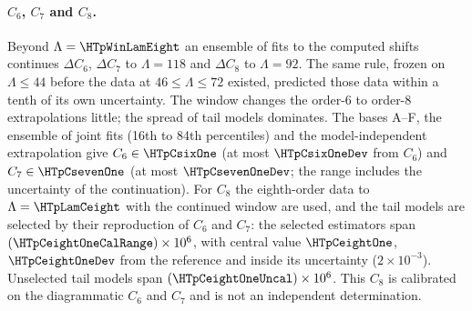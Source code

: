 \paragraph{$C_6$, $C_7$ and $C_8$.} Beyond $\Lambda=\HTpWinLamEight$ an ensemble of fits to the computed shifts continues
$\Delta C_6$, $\Delta C_7$ to $\Lambda=118$ and $\Delta C_8$ to $\Lambda=92$. The same rule, frozen on $\Lambda\le44$ before the data at $46\le\Lambda\le72$ existed, predicted those data within a tenth
of its own uncertainty. The window changes the order-6 to order-8 extrapolations little; the spread of tail models
dominates. The bases A--F, the ensemble of joint fits (16th to 84th percentiles) and the model-independent
extrapolation give $C_6\in\HTpCsixOne$
(at most $\HTpCsixOneDev$ from $C_6$) and $C_7\in\HTpCsevenOne$ (at most $\HTpCsevenOneDev$; the range includes the
uncertainty of the continuation). For $C_8$ the eighth-order data to $\Lambda=\HTpLamCeight$ with the continued window
are used, and the tail models are selected by their reproduction of $C_6$ and $C_7$: the selected estimators span
$(\HTpCeightOneCalRange)\times10^6$, with central value $\HTpCeightOne$, $\HTpCeightOneDev$ from the reference and inside
its uncertainty ($2\times10^{-3}$). Unselected tail models span $(\HTpCeightOneUncal)\times10^6$. This $C_8$ is calibrated
on the diagrammatic $C_6$ and $C_7$ and is not an independent determination.

